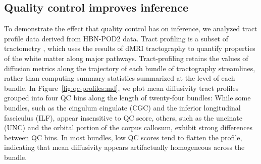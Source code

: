 \documentclass[9pt,lineno]{elife}
\begin{document}
\subsection{Quality control improves inference}

To demonstrate the effect that quality control has on inference, we analyzed
tract profile data derived from HBN-POD2 data. Tract profiling
\citep{yeatman2012-rc,jones2005pasta,colby2012along,odonnell2009tract,
kruper2021evaluating} is a subset of tractometry
\citep{jones2005pasta,bells2011tractometry}, which uses the results of dMRI
tractography to quantify properties of the white matter along major pathways.
Tract-profiling retains the values of diffusion metrics along the trajectory of
each bundle of tractography streamlines, rather than computing summary
statistics summarized at the level of each bundle. In
Figure~\ref{fig:qc-profiles:md}, we plot mean diffusivity tract profiles grouped
into four QC bins along the length of twenty-four bundles: While some bundles,
such as the cingulum cingulate (CGC) and the inferior longitudinal fasciculus
(ILF), appear insensitive to QC score, others, such as the uncinate (UNC) and
the orbital portion of the corpus callosum, exhibit strong differences between
QC bins. In most bundles, low QC scores tend to flatten the profile, indicating that mean diffusivity appears artifactually homogeneous across the bundle.
\end{document}
